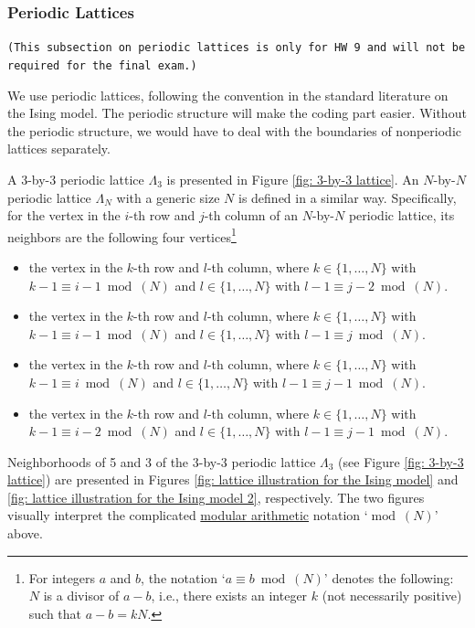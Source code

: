\documentclass[11pt,letterpaper, leqno]{article}
\numberwithin{equation}{section}
\numberwithin{theorem}{section}
\numberwithin{lemma}{section}
\numberwithin{corollary}{section}
\numberwithin{definition}{section}
\numberwithin{proposition}{section}
\numberwithin{remark}{section}
\numberwithin{example}{section}
\begin{document}
\subsubsection{Periodic Lattices}\label{Periodic Lattices}

\texttt{(This subsection on periodic lattices is only for HW 9 and will not be required for the final exam.)}

We use periodic lattices, following the convention in the standard literature on the Ising model. The periodic structure will make the coding part easier. Without the periodic structure, we would have to deal with the boundaries of nonperiodic lattices separately.

A 3-by-3 periodic lattice $\Lambda_3$ is presented in Figure \ref{fig: 3-by-3 lattice}. An $N$-by-$N$ periodic lattice $\Lambda_N$ with a generic size $N$ is defined in a similar way. Specifically, for the vertex in the $i$-th row and $j$-th column of an $N$-by-$N$ periodic lattice, its neighbors are the following four vertices\footnote{For integers $a$ and $b$, the notation `$a \equiv b \ \operatorname{mod}\ (N)$' denotes the following: $N$ is a divisor of $a-b$, i.e., there exists an integer $k$ (not necessarily positive) such that $a-b=kN$.}
\begin{itemize}
    \item the vertex in the $k$-th row and $l$-th column, where $k\in\{1,\ldots,N\}$ with $k-1 \equiv i-1 \ \operatorname{mod}\ (N)$ and $l\in\{1,\ldots,N\}$ with $l-1 \equiv j-2 \ \operatorname{mod}\ (N)$.
    \item the vertex in the $k$-th row and $l$-th column, where $k\in\{1,\ldots,N\}$ with $k-1 \equiv i-1\ \operatorname{mod}\ (N)$ and $l\in\{1,\ldots,N\}$ with $l-1 \equiv j \ \operatorname{mod}\ (N)$.
    \item the vertex in the $k$-th row and $l$-th column, where $k\in\{1,\ldots,N\}$ with $k-1 \equiv i \ \operatorname{mod}\ (N)$ and $l\in\{1,\ldots,N\}$ with $l-1 \equiv j-1 \ \operatorname{mod}\ (N)$.
    \item the vertex in the $k$-th row and $l$-th column, where $k\in\{1,\ldots,N\}$ with $k-1 \equiv i-2 \ \operatorname{mod}\ (N)$ and $l\in\{1,\ldots,N\}$ with $l-1 \equiv j-1 \ \operatorname{mod}\ (N)$.
\end{itemize}
Neighborhoods of 5 and 3 of the 3-by-3 periodic lattice $\Lambda_3$ (see Figure \ref{fig: 3-by-3 lattice}) are presented in Figures \ref{fig: lattice illustration for the Ising model} and \ref{fig: lattice illustration for the Ising model 2}, respectively. The two figures visually interpret the complicated \href{https://en.wikipedia.org/wiki/Modular_arithmetic}{modular arithmetic} notation `$\operatorname{mod}\ (N)$' above.
\end{document}
